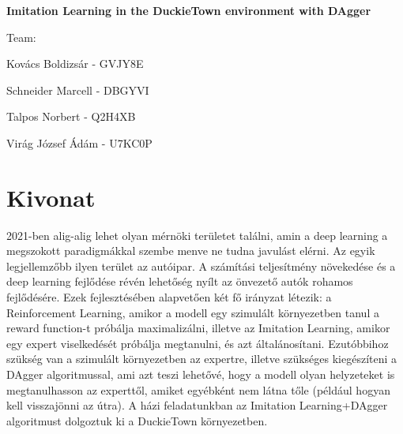 \documentclass{article}
\begin{document}
\begin{center}
\vspace*{15\baselineskip}

{\huge \textbf{Imitation Learning in the DuckieTown environment with DAgger}}

\vspace*{3\baselineskip}

\begin{large}
\vspace*{2\baselineskip}

\vspace*{2\baselineskip}

Team:

\vspace*{\baselineskip}

Kovács Boldizsár - GVJY8E

\vspace*{\baselineskip}

Schneider Marcell - DBGYVI

\vspace*{\baselineskip}

Talpos Norbert - Q2H4XB

\vspace*{\baselineskip}

Virág József Ádám - U7KC0P

\vspace*{\baselineskip}

\end{large}
\end{center}
\pagebreak


\section*{Kivonat}
\large
2021-ben alig-alig lehet olyan mérnöki területet találni, amin a deep learning a megszokott paradigmákkal szembe menve ne tudna javulást elérni.
Az egyik legjellemzőbb ilyen terület az autóipar. A számítási teljesítmény növekedése és a deep learning fejlődése révén lehetőség nyílt az önvezető autók rohamos fejlődésére. Ezek fejlesztésében alapvetően két fő irányzat létezik: a Reinforcement Learning, amikor a modell egy szimulált környezetben tanul a reward function-t próbálja maximalizálni, illetve az Imitation Learning, amikor egy expert viselkedését próbálja megtanulni, és azt általánosítani.
Ezutóbbihoz szükség van a szimulált környezetben az expertre, illetve szükséges kiegészíteni a DAgger algoritmussal, ami azt teszi lehetővé, hogy a modell olyan helyzeteket is megtanulhasson az experttől, amiket egyébként nem látna tőle (például hogyan kell visszajönni az útra).
A házi feladatunkban az Imitation Learning+DAgger algoritmust dolgoztuk ki a DuckieTown környezetben.
\end{document}
